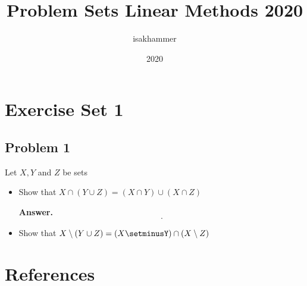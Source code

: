 \documentclass{article}
\title{Problem Sets Linear Methods 2020}
\author{isakhammer }
\date{2020}
\theoremstyle{remark}
\begin{document}
\maketitle
\tableofcontents
\newpage

\newpage
\section{Exercise Set 1}%
\label{sec:exercise_set_1}

\subsection{Problem 1}%
\label{sub:problem_1}

Let $X,Y$ and $Z$ be sets
\begin{itemize}
  \item Show that $X\cap \left( Y\cup Z \right) = \left( X\cap Y \right) \cup  \left( X\cap Z \right)$ 
    \begin{tcolorbox}
      \textbf{Answer.}  
      \[
      .
      \] 
    \end{tcolorbox}

  \item Show that $X\setminus \left( Y\cup Z \right) = \left( X \setminusY \right) \cap  \left( X \setminus Z \right)$
\end{itemize}




\newpage
\section{References}%
\label{sec:references}



\end{document}
